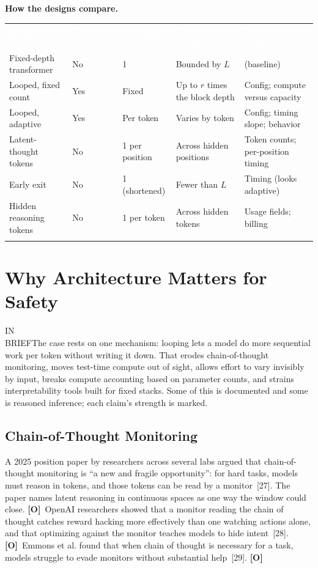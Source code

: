 \documentclass[11pt,letterpaper]{article}
\newcommand{\inbrief}[1]{\begin{inbriefbox}IN\\BRIEF\tcblower #1\end{inbriefbox}}
\newcommand{\hd}[1]{\textcolor{white}{\bfseries #1}}
\newcommand{\tablefinish}{\arrayrulecolor{deepindigo}\specialrule{0.8pt}{0pt}{0pt}\arrayrulecolor{black}}
\newcommand{\zebra}{\rowcolors{2}{white}{paleindigo!75}}
\newcommand{\mO}{\textcolor{sensorteal}{\textbf{[O]}}}
\begin{document}
\textbf{How the designs compare.}

{\footnotesize
\zebra
\begin{tabularx}{\textwidth}{L{3.6cm} L{1.5cm} L{2.0cm} L{2.6cm} Y}
\hd{Design} & \hd{Weights reused} & \hd{Iterations} & \hd{Unwritten serial steps} & \hd{Detectable from} \\
Fixed-depth transformer & No & 1 & Bounded by $L$ & (baseline) \\
Looped, fixed count & Yes & Fixed & Up to $r$ times the block depth & Config; compute versus capacity \\
Looped, adaptive & Yes & Per token & Varies by token & Config; timing slope; behavior \\
Latent-thought tokens & No & 1 per position & Across hidden positions & Token counts; per-position timing \\
Early exit & No & 1 (shortened) & Fewer than $L$ & Timing (looks adaptive) \\
Hidden reasoning tokens & No & 1 per token & Across hidden tokens & Usage fields; billing \\
\tablefinish
\end{tabularx}\par}

\section{Why Architecture Matters for Safety}
\label{sec:why}

\inbrief{The case rests on one mechanism: looping lets a model do more sequential work per token without writing it down. That erodes chain-of-thought monitoring, moves test-time compute out of sight, allows effort to vary invisibly by input, breaks compute accounting based on parameter counts, and strains interpretability tools built for fixed stacks. Some of this is documented and some is reasoned inference; each claim's strength is marked.}

\subsection{Chain-of-Thought Monitoring}

A 2025 position paper by researchers across several labs argued that chain-of-thought monitoring is ``a new and fragile opportunity'': for hard tasks, models must reason in tokens, and those tokens can be read by a monitor~[27]. The paper names latent reasoning in continuous spaces as one way the window could close. \mO\ OpenAI researchers showed that a monitor reading the chain of thought catches reward hacking more effectively than one watching actions alone, and that optimizing against the monitor teaches models to hide intent~[28]. \mO\ Emmons et al. found that when chain of thought is necessary for a task, models struggle to evade monitors without substantial help~[29]. \mO
\end{document}
